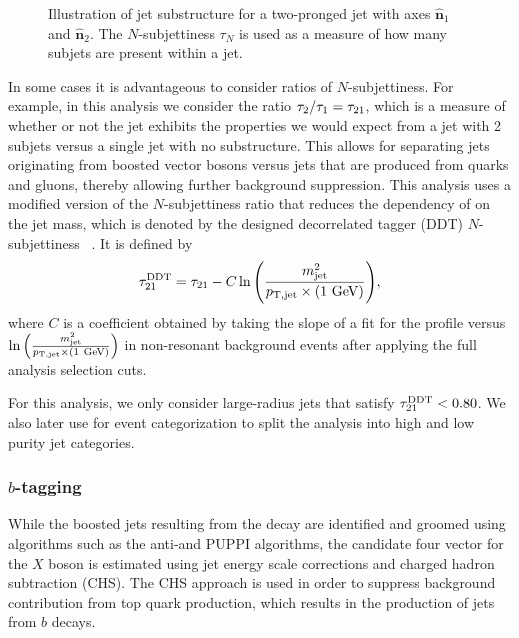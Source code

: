 \begin{figure}[htbp]
  \centering
  
  \caption{
    Illustration of jet substructure for a two-pronged jet with axes $\mathbf{\hat{n}}_1$ and $\mathbf{\hat{n}}_2$.
    The $N$-subjettiness $\tau_N$ is used as a measure of how many subjets are present within a jet.
  }
  \label{fig:jetSubstruct}
\end{figure}

In some cases it is advantageous to consider ratios of $N$-subjettiness.
For example, in this analysis we consider the ratio $\tau_2/\tau_1=\tau_{21}$, which is a measure of whether or not the jet exhibits the properties we would expect from a jet with 2 subjets versus a single jet with no substructure.
This allows for separating jets originating from boosted vector bosons versus jets that are produced from quarks and gluons, thereby allowing further background suppression.
This analysis uses a modified version of the $N$-subjettiness ratio that reduces the dependency of \nsubj on the jet mass, which is denoted by the designed decorrelated tagger (DDT) $N$-subjettiness \nsubjDDT~\cite{Dolen_2016}.
It is defined by
\begin{equation}
  \nsubjDDT=\nsubj-C\ln\pqty{\frac{\MJ^2}{\ptjet\times(1\unit{GeV})}},
\end{equation}
where $C$ is a coefficient obtained by taking the slope of a fit for the \nsubj profile versus $\ln\pqty{\frac{\MJ^2}{\ptjet\times(1\unit{GeV})}}$ in non-resonant \Wjets background events after applying the full analysis selection cuts.

For this analysis, we only consider large-radius jets that satisfy $\tau_{21}^\mathrm{DDT}<0.80$.
We also later use \nsubjDDT for event categorization to split the analysis into high and low purity jet categories.

\subsubsection{$b$-tagging}

While the boosted jets resulting from the \Vhad decay are identified and groomed using algorithms such as the anti-\kt and PUPPI algorithms, the candidate four vector for the $X$ boson is estimated using jet energy scale corrections and charged hadron subtraction (CHS).
The CHS approach is used in order to suppress background contribution from top quark production, which results in the production of jets from $b$ decays.

